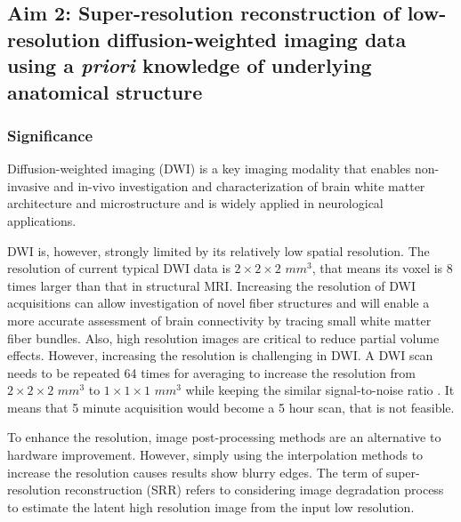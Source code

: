 \subsection{Aim 2: Super-resolution reconstruction of low-resolution diffusion-weighted imaging data using a \emph{priori} knowledge of underlying anatomical structure}
\label{subsection:Aim2ResearchDesign}

\subsubsection{Significance}

Diffusion-weighted imaging (DWI) is a key imaging modality that enables non-invasive and in-vivo investigation and characterization of brain white matter architecture and microstructure and is widely applied in neurological applications.

DWI is, however, strongly limited by its relatively low spatial resolution. The resolution of current typical DWI data is $2 \times 2 \times 2$  $mm^3$, that means its voxel is $8$ times larger than that in structural MRI.
Increasing the resolution of DWI acquisitions can allow investigation of novel fiber structures and will enable a more accurate assessment of brain connectivity by tracing small white matter fiber bundles. Also, high resolution images are critical to reduce partial volume effects.
However, increasing the resolution is challenging in DWI. A DWI scan needs to be repeated 64 times for averaging to increase the resolution from $2 \times 2 \times 2$ $mm^3$ to $1 \times 1 \times 1$ $mm^3$ while keeping the similar signal-to-noise ratio \cite{brown2014}. It means that 5 minute acquisition would become a 5 hour scan, that is not feasible.

To enhance the resolution, image post-processing methods are an alternative to hardware improvement.
However, simply using the interpolation methods to increase the resolution causes results show blurry edges.
The term of super-resolution reconstruction (SRR) refers to considering image degradation process to estimate the latent high resolution image from the input low resolution.

